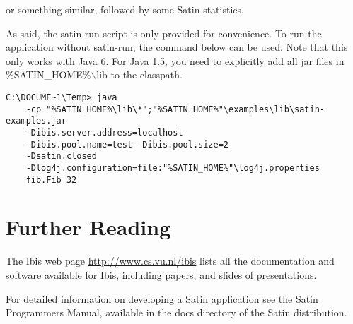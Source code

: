 \documentclass[a4paper,10pt]{article}
\begin{document}
or something similar, followed by some Satin statistics.

As said, the satin-run script is only provided for convenience. To run
the application without satin-run, the command below can be used.
Note that this only works with Java 6. For Java 1.5, you need to
explicitly add all jar files in \%SATIN\_HOME\%$\backslash$lib to the classpath.

\noindent
{\small
\begin{verbatim}
C:\DOCUME~1\Temp> java
    -cp "%SATIN_HOME%\lib\*";"%SATIN_HOME%"\examples\lib\satin-examples.jar
    -Dibis.server.address=localhost
    -Dibis.pool.name=test -Dibis.pool.size=2
    -Dsatin.closed
    -Dlog4j.configuration=file:"%SATIN_HOME%"\log4j.properties
    fib.Fib 32
\end{verbatim}
}
\noindent

\section{Further Reading}

The Ibis web page \url{http://www.cs.vu.nl/ibis} lists all
the documentation and software available for Ibis, including papers, and
slides of presentations.

For detailed information on developing a Satin application see the
Satin Programmers Manual, available in the docs directory of the Satin
distribution.
\end{document}
